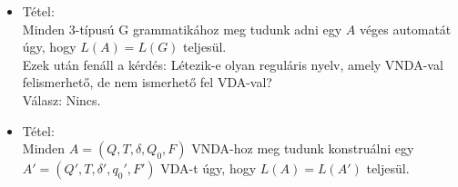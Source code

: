 \documentclass[margin=0px]{article}
\begin{document}
\begin{description}
\begin{itemize}
            \item Tétel: \\
                  Minden 3-típusú G grammatikához meg tudunk adni egy $A$ véges automatát úgy, hogy $L(A) = L(G)$ teljesül. \\


                  Ezek után fenáll a kérdés: Létezik-e olyan reguláris nyelv, amely VNDA-val felismerhető, de nem ismerhető fel VDA-val? \\
                  Válasz: Nincs.

            \item Tétel:\\
                  Minden $A = (Q, T, \delta,Q_0, F)$ VNDA-hoz  meg tudunk konstruálni egy $A' = (Q', T, \delta', q_0', F')$ VDA-t úgy, hogy $L(A) = L(A')$ teljesül.
        \end{itemize}
\end{description}
\end{document}
